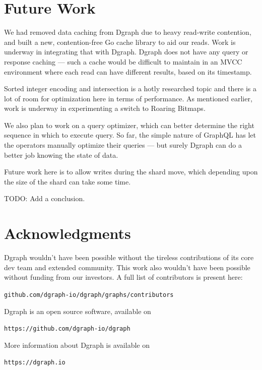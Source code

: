 \documentclass[letterpaper,twocolumn,10pt]{article}
\begin{document}
\section{Future Work}

We had removed data caching from Dgraph due to heavy read-write contention, and
built a new, contention-free Go cache library to aid our reads. Work is underway
in integrating that with Dgraph. Dgraph does not have any query or response
caching --- such a cache would be difficult to maintain in an MVCC environment
where each read can have different results, based on its timestamp.

Sorted integer encoding and intersection is a hotly researched topic and there
is a lot of room for optimization here in terms of performance. As mentioned
earlier, work is underway in experimenting a switch to Roaring Bitmaps.

We also plan to work on a query optimizer, which can better determine the right
sequence in which to execute query. So far, the simple nature of GraphQL has
let the operators manually optimize their queries --- but surely Dgraph can do a
better job knowing the state of data.

Future work here is to allow writes during the shard move, which depending upon
the size of the shard can take some time.

TODO: Add a conclusion.

\section{Acknowledgments}

Dgraph wouldn't have been possible without the tireless contributions of its
core dev team and extended community. This work also wouldn't have been possible
without funding from our investors. A full list of contributors is present here:
\begin{center}
  {\tt github.com/dgraph-io/dgraph/graphs/contributors}
\end{center}

Dgraph is an open source software, available on
\begin{center}
  {\tt https://github.com/dgraph-io/dgraph}\\
\end{center}

More information about Dgraph is available on
\begin{center}
  {\tt https://dgraph.io}
\end{center}

{\footnotesize 
  }
\end{document}
